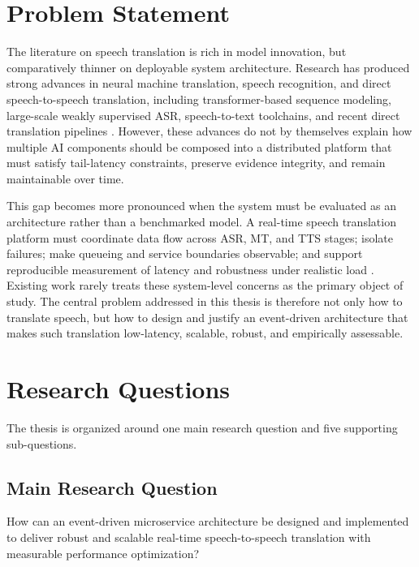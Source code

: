 \section{Problem Statement}
\label{sec:problem}

The literature on speech translation is rich in model innovation, but comparatively thinner on deployable system architecture. Research has produced strong advances in neural machine translation, speech recognition, and direct speech-to-speech translation, including transformer-based sequence modeling, large-scale weakly supervised ASR, speech-to-text toolchains, and recent direct translation pipelines \cite{bahdanau2014neural,vaswani2017attention,radford2022whisper,wang2020fairseq,inaguma2023unity,sarim2024direct,zhang2024direct}. However, these advances do not by themselves explain how multiple AI components should be composed into a distributed platform that must satisfy tail-latency constraints, preserve evidence integrity, and remain maintainable over time.

This gap becomes more pronounced when the system must be evaluated as an architecture rather than a benchmarked model. A real-time speech translation platform must coordinate data flow across ASR, MT, and TTS stages; isolate failures; make queueing and service boundaries observable; and support reproducible measurement of latency and robustness under realistic load \cite{kleppmann2017designing,hohpe2004enterprise,bass2023engineeringai,xu2025scalability}. Existing work rarely treats these system-level concerns as the primary object of study. The central problem addressed in this thesis is therefore not only how to translate speech, but how to design and justify an event-driven architecture that makes such translation low-latency, scalable, robust, and empirically assessable.

\section{Research Questions}
\label{sec:research-questions}

The thesis is organized around one main research question and five supporting sub-questions.

\subsection{Main Research Question}

How can an event-driven microservice architecture be designed and implemented to deliver robust and scalable real-time speech-to-speech translation with measurable performance optimization?

